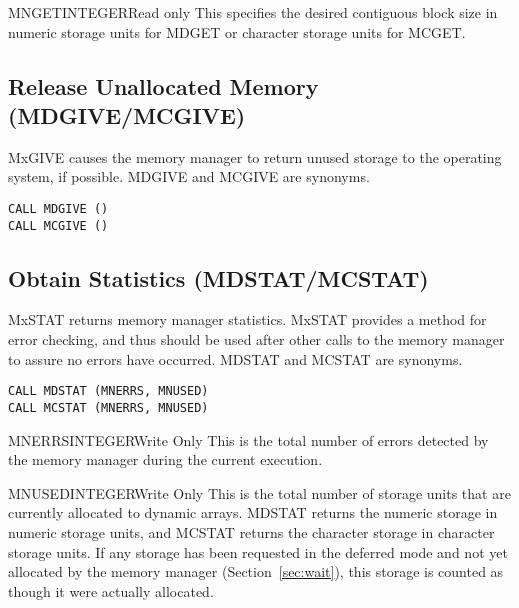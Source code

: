 \begin{argy}{MNGET}{INTEGER}{Read only}
This specifies the desired contiguous block size in numeric storage units
for MDGET or character storage units for MCGET.
\end{argy}

\subsection{Release Unallocated Memory (MDGIVE/MCGIVE)}
MxGIVE 
causes the memory manager to return unused storage to the operating
system, if possible. MDGIVE and MCGIVE are synonyms.
\begin{verbatim}
CALL MDGIVE ()
CALL MCGIVE ()
\end{verbatim}

\subsection{Obtain Statistics (MDSTAT/MCSTAT)}
MxSTAT returns memory manager statistics.  MxSTAT provides a method
for error checking, and thus should be used after other calls to the memory
manager to assure no errors have occurred. MDSTAT and MCSTAT are synonyms.
\begin{verbatim}
CALL MDSTAT (MNERRS, MNUSED)
CALL MCSTAT (MNERRS, MNUSED)
\end{verbatim}

\begin{argy}{MNERRS}{INTEGER}{Write Only}
This is the total number of errors detected by the memory manager during the
current execution. 
\end{argy}

\begin{argy}{MNUSED}{INTEGER}{Write Only}
This is the total number of storage units that are currently allocated to
dynamic arrays. MDSTAT returns the numeric storage in numeric storage units,
and MCSTAT returns the character storage in character storage units. If any
storage has been requested in the deferred mode and not yet allocated by the
memory manager (Section~\ref{sec:wait}), this storage is counted as though 
it were actually allocated.
\end{argy}

